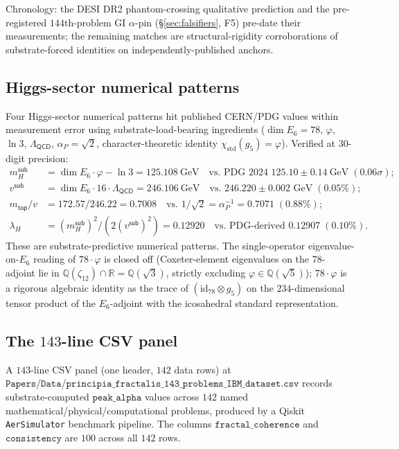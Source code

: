 \documentclass[11pt,a4paper]{amsart}
\theoremstyle{plain}
\theoremstyle{definition}
\begin{document}
Chronology: the DESI DR2 phantom-crossing qualitative prediction and the pre-registered $144$th-problem GI $\alpha$-pin (\S\ref{sec:falsifiers}, F5) pre-date their measurements; the remaining matches are structural-rigidity corroborations of substrate-forced identities on independently-published anchors.

\subsection{Higgs-sector numerical patterns}\label{subsec:higgs-sector}

Four Higgs-sector numerical patterns hit published CERN/PDG values within measurement error using substrate-load-bearing ingredients ($\dim E_{6} = 78$, $\varphi$, $\ln 3$, $\Lambda_{\textsf{QCD}}$, $\alpha_{P} = \sqrt{2}$, character-theoretic identity $\chi_{\mathrm{std}}(g_{5}) = \varphi$). Verified at $30$-digit precision:
\begin{align*}
m_{H}^{\textsf{sub}} &= \dim E_{6} \cdot \varphi - \ln 3 = 125.108~\text{GeV} \quad \text{vs. PDG 2024 } 125.10 \pm 0.14~\text{GeV}\; (0.06\sigma);\\
v^{\textsf{sub}} &= \dim E_{6} \cdot 16 \cdot \Lambda_{\textsf{QCD}} = 246.106~\text{GeV} \quad \text{vs. } 246.220 \pm 0.002 \text{ GeV}\; (0.05\%);\\
m_{\textsf{top}}/v &= 172.57 / 246.22 = 0.7008 \quad \text{vs. } 1/\sqrt{2} = \alpha_{P}^{-1} = 0.7071\; (0.88\%);\\
\lambda_{H} &= (m_{H}^{\textsf{sub}})^{2}/(2(v^{\textsf{sub}})^{2}) = 0.12920 \quad \text{vs. PDG-derived } 0.12907\; (0.10\%).
\end{align*}
These are substrate-predictive numerical patterns. The single-operator eigenvalue-on-$E_{6}$ reading of $78 \cdot \varphi$ is closed off (Coxeter-element eigenvalues on the 78-adjoint lie in $\mathbb{Q}(\zeta_{12}) \cap \mathbb{R} = \mathbb{Q}(\sqrt{3})$, strictly excluding $\varphi \in \mathbb{Q}(\sqrt{5})$); $78 \cdot \varphi$ is a rigorous algebraic identity as the trace of $(\mathrm{id}_{78} \otimes g_{5})$ on the $234$-dimensional tensor product of the $E_{6}$-adjoint with the icosahedral standard representation.

\subsection{The $143$-line CSV panel}\label{subsec:ibm-csv}

A $143$-line CSV panel (one header, $142$ data rows) at $\texttt{Papers/Data/principia\_fractalis\_143\_problems\_IBM\_dataset.csv}$ records substrate-computed $\texttt{peak\_alpha}$ values across $142$ named mathematical/physical/computational problems, produced by a Qiskit \texttt{AerSimulator} benchmark pipeline. The columns $\texttt{fractal\_coherence}$ and $\texttt{consistency}$ are $100$ across all $142$ rows.
\end{document}
